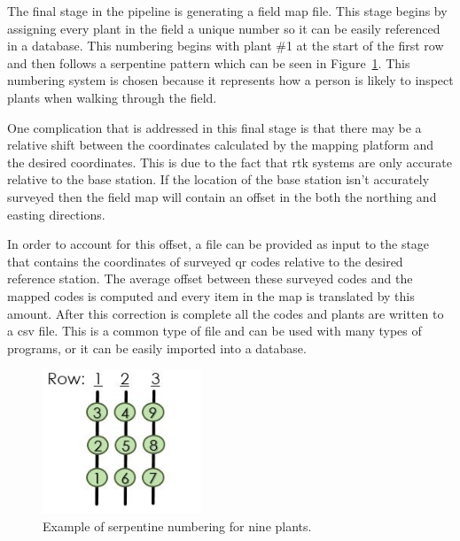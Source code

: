 The final stage in the pipeline is generating a field map file.  This stage begins by assigning every plant in the field a unique number so it can be easily referenced in a database.  This numbering begins with plant \#1 at the start of the first row and then follows a serpentine pattern which can be seen in Figure~\ref{figure:serpentine}. This numbering system is chosen because it represents how a person is likely to inspect plants when walking through the field.  

One complication that is addressed in this final stage is that there may be a relative shift between the coordinates calculated by the mapping platform and the desired coordinates.  This is due to the fact that \ac{rtk} systems are only accurate relative to the base station.  If the location of the base station isn't accurately surveyed then the field map will contain an offset in the both the northing and easting directions. 

In order to account for this offset, a file can be provided as input to the stage that contains the coordinates of surveyed \ac{qr} codes relative to the desired reference station.  The average offset between these surveyed codes and the mapped codes is computed and every item in the map is translated by this amount. After this correction is complete all the codes and plants are written to a \ac{csv} file.  This is a common type of file and can be used with many types of programs, or it can be easily imported into a database.

\begin{figure}
	\centering
    \includegraphics[height=1.7in]{figures/sepentine.jpg}
    \caption[Serpentine numbering]{Example of serpentine numbering for nine plants.}
    \label{figure:serpentine}
\end{figure}
